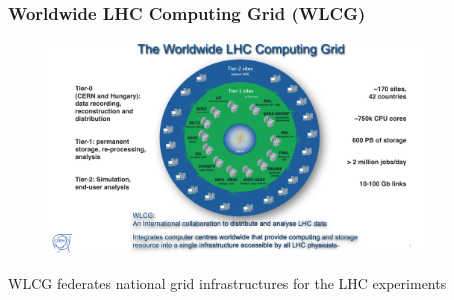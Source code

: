 \begin{frame}
\frametitle{Worldwide LHC Computing Grid (WLCG)}

\begin{figure}[htbp]
\begin{center}
\includegraphics[width=0.9\textwidth]{images/WLCG-2017.png}
\end{center}
\end{figure}

\small{WLCG federates national grid infrastructures for the LHC experiments}

\end{frame}


